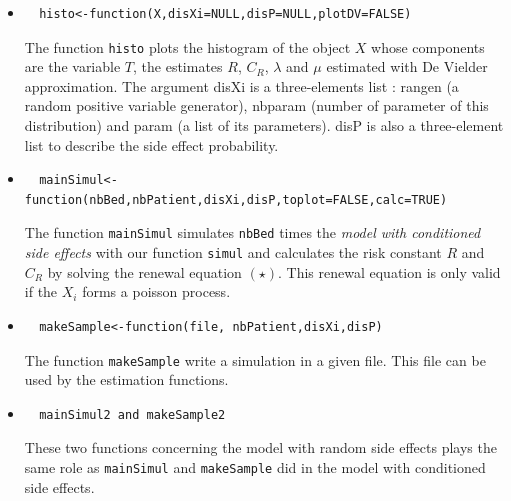 \documentclass[12pt,twoside]{article}
\begin{document}
\begin{itemize}

	\item{\begin{footnotesize}\begin{verbatim}	histo<-function(X,disXi=NULL,disP=NULL,plotDV=FALSE)	\end{verbatim}\end{footnotesize}}
	The function \texttt{histo} plots the histogram of the object $X$ whose components are the variable $T$, the estimates $R$, $C_R$, $\lambda$ and $\mu$ estimated with De Vielder approximation. The argument disXi is a three-elements list : rangen (a random positive variable generator),
	       nbparam (number of parameter of this distribution) and param (a list of its parameters). disP is also a three-element list to describe the side effect probability.
	\item{\begin{footnotesize}\begin{verbatim}	mainSimul<-function(nbBed,nbPatient,disXi,disP,toplot=FALSE,calc=TRUE)	\end{verbatim}\end{footnotesize}}
	The function \texttt{mainSimul} simulates \texttt{nbBed} times the \textsl{model with conditioned side effects} with our function \texttt{simul}
	and calculates the risk constant $R$ and $C_R$ by solving the renewal equation $(\star)$. This renewal equation is only valid if the $X_i$ forms a poisson process.
	
	\item{\begin{footnotesize}\begin{verbatim}	makeSample<-function(file, nbPatient,disXi,disP)	\end{verbatim}\end{footnotesize}}
	The function \texttt{makeSample} write a simulation in a given file. This file can be used by the estimation functions.
	
	\item{\begin{footnotesize}\begin{verbatim}	mainSimul2 and makeSample2	\end{verbatim}\end{footnotesize}}
	These two functions concerning the model with random side effects plays the same role as 
	\texttt{mainSimul} and \texttt{makeSample} did in the model with conditioned side effects.
	
\end{itemize}
\end{document}
